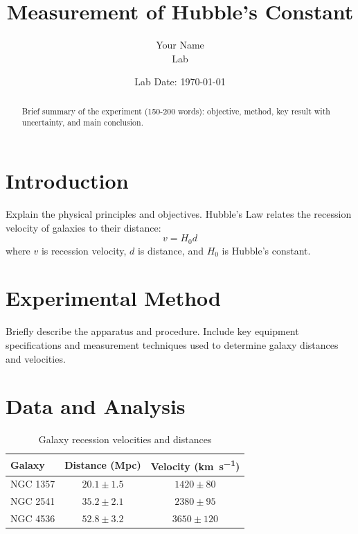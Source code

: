 \documentclass[11pt]{article}
\title{Measurement of Hubble's Constant}
\author{Your Name \\ Lab}
\date{Lab Date: \today}
\begin{document}
\maketitle

\begin{abstract}
Brief summary of the experiment (150-200 words): objective, method, key result with uncertainty, and main conclusion.
\end{abstract}

\section{Introduction}
Explain the physical principles and objectives. Hubble's Law relates the recession velocity of galaxies to their distance:
\begin{equation}
    v = H_0 d
    \label{eq:hubble}
\end{equation}
where $v$ is recession velocity, $d$ is distance, and $H_0$ is Hubble's constant.

\section{Experimental Method}
Briefly describe the apparatus and procedure. Include key equipment specifications and measurement techniques used to determine galaxy distances and velocities.

\section{Data and Analysis}

\begin{table}[h]
    \centering
    \caption{Galaxy recession velocities and distances}
    \begin{tabular}{lcc}
        \toprule
        Galaxy & Distance (Mpc) & Velocity (\si{\kilo\meter\per\second}) \\
        \midrule
        NGC 1357 & $20.1 \pm 1.5$ & $1420 \pm 80$ \\
        NGC 2541 & $35.2 \pm 2.1$ & $2380 \pm 95$ \\
        NGC 4536 & $52.8 \pm 3.2$ & $3650 \pm 120$ \\
        \bottomrule
    \end{tabular}
\end{table}
\end{document}
